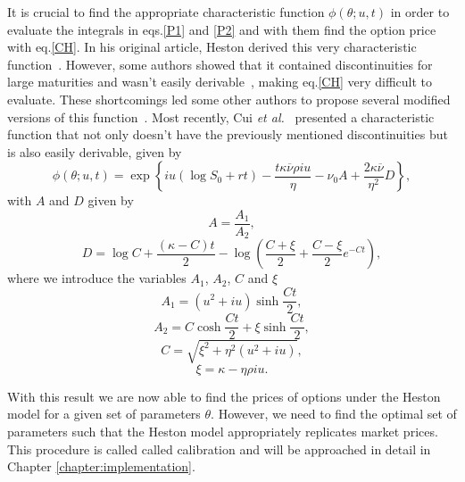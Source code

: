 It is crucial to find the appropriate characteristic function $\phi(\theta;u,t)$ in order to evaluate the integrals in eqs.\eqref{P1} and \eqref{P2} and with them find the option price with eq.\eqref{CH}. In his original article, Heston derived this very characteristic function~\cite{Heston}. However, some authors showed that it contained discontinuities for large maturities and wasn't easily derivable~\cite{Kahl}, making eq.\eqref{CH} very difficult to evaluate. These shortcomings led some other authors to propose several modified versions of this function~\cite{Rollin,Schoutens}. Most recently, Cui \textit{et al.}~\cite{Cui} presented a characteristic function that not only doesn't have the previously mentioned discontinuities but is also easily derivable, given by
\begin{equation}
\phi(\theta;u,t)=\exp\left\{iu\left(\log S_0+rt\right)-\frac{t\kappa\overline{\nu}\rho iu}{\eta}-\nu_0A+\frac{2\kappa\overline{\nu}}{\eta^2}D\right\},
\end{equation}
\noindent with $A$ and $D$ given by
\begin{equation}
A=\frac{A_1}{A_2},
\end{equation}
\begin{equation}
D=\log C+\frac{(\kappa-C) t}{2}-\log\left(\frac{C+\xi}{2}+\frac{C-\xi}{2}e^{-C t}\right),
\end{equation}
\noindent where we introduce the variables $A_1$, $A_2$, $C$  and $\xi$
\begin{equation}
A_1=(u^2+iu)\sinh\frac{Ct}{2},
\end{equation}
\begin{equation}
A_2=C\cosh\frac{C t}{2}+\xi\sinh\frac{C t}{2},
\end{equation}
\begin{equation}
C=\sqrt{\xi^2+\eta^2(u^2+iu)},
\end{equation}
\begin{equation}
\xi=\kappa-\eta\rho iu.
\end{equation}




With this result we are now able to find the prices of options under the Heston model for a given set of parameters $\theta$. However, we need to find the optimal set of parameters such that the Heston model appropriately replicates market prices. This procedure is called called calibration and will be approached in detail in Chapter \ref{chapter:implementation}.

\iffalse
Calibrating the parameters  $\rho$, $\kappa$, $\overline{\nu}$ and $\eta$ is absolutely critical. A model with badly calibrated parameters would output wrong predictions, rendering it completely useless.
This calibration requires a fair amount of past market data and is by far the most complex and computationally demanding section of this model. We will deal with it in the next section.
\fi





